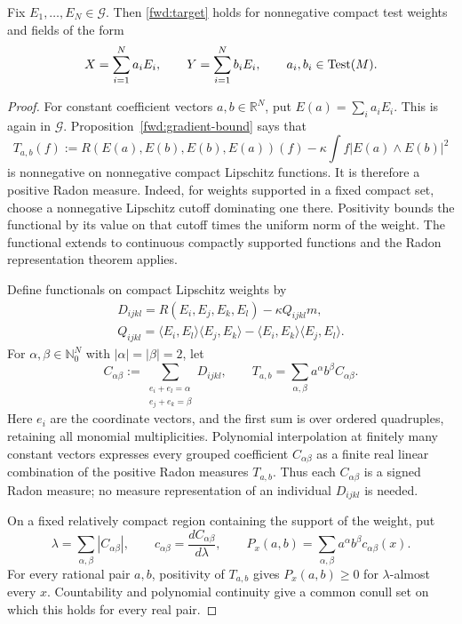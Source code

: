 \begin{lemma}
\label{fwd:coefficients}
Fix \(E_1,\ldots,E_N\in\mathcal G\). Then
\eqref{fwd:target} holds for nonnegative compact test weights and fields of the
form
\[
 X=\sum_{i=1}^N a_iE_i,
 \qquad Y=\sum_{i=1}^N b_iE_i,
 \qquad a_i,b_i\in\operatorname{Test}(M).
\]
\end{lemma}

\begin{proof}
For constant coefficient vectors \(a,b\in\mathbb R^N\), put
\(E(a)=\sum_i a_iE_i\). This is again in \(\mathcal G\).
Proposition~\ref{fwd:gradient-bound} says that
\[
 T_{a,b}(f):=
 R(E(a),E(b),E(b),E(a))(f)
 -\kappa\int f|E(a)\wedge E(b)|^2
\]
is nonnegative on nonnegative compact Lipschitz functions.
It is therefore a positive Radon measure. Indeed, for weights
supported in a fixed compact set, choose a nonnegative Lipschitz
cutoff dominating one there. Positivity bounds the functional by
its value on that cutoff times the uniform norm of the weight.
The functional extends to continuous compactly supported functions
and the Radon representation theorem applies.

Define functionals on compact Lipschitz weights by
\[
 \begin{gathered}
 D_{ijkl}=R(E_i,E_j,E_k,E_l)-\kappa Q_{ijkl}m,\\
 Q_{ijkl}=\langle E_i,E_l\rangle\langle E_j,E_k\rangle
          -\langle E_i,E_k\rangle\langle E_j,E_l\rangle.
 \end{gathered}
\]
For \(\alpha,\beta\in\mathbb N_0^N\) with
\(|\alpha|=|\beta|=2\), let
\[
 C_{\alpha\beta}
 :=\sum_{\substack{e_i+e_l=\alpha\\e_j+e_k=\beta}}D_{ijkl},
 \qquad
 T_{a,b}=\sum_{\alpha,\beta}a^\alpha b^\beta C_{\alpha\beta}.
\]
Here \(e_i\) are the coordinate vectors, and the first sum is
over ordered quadruples, retaining all monomial multiplicities.
Polynomial interpolation at finitely many constant vectors
expresses every grouped coefficient \(C_{\alpha\beta}\) as a
finite real linear combination of the positive Radon measures
\(T_{a,b}\). Thus each \(C_{\alpha\beta}\) is a signed Radon
measure; no measure representation of an individual \(D_{ijkl}\)
is needed.

On a fixed relatively compact region containing the support of
the weight, put
\[
 \lambda=\sum_{\alpha,\beta}|C_{\alpha\beta}|,\qquad
 c_{\alpha\beta}=\frac{dC_{\alpha\beta}}{d\lambda},\qquad
 P_x(a,b)=\sum_{\alpha,\beta}a^\alpha b^\beta
 c_{\alpha\beta}(x).
\]
For every rational pair \(a,b\), positivity of \(T_{a,b}\)
gives \(P_x(a,b)\geq0\) for \(\lambda\)-almost every \(x\).
Countability and polynomial continuity give a common conull set
on which this holds for every real pair.


\end{proof}
